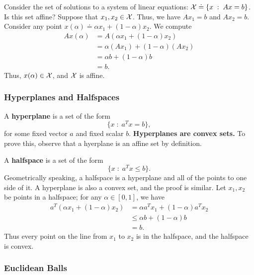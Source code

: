 \documentclass[12pt]{article}
\begin{document}
\begin{example}
Consider the set of solutions to a system of linear equations: ${\mathcal X} \doteq \{x \; : \; Ax = b\}$. Is this set affine? Suppose that $x_1, x_2 \in {\mathcal X}$. Thus, we have $Ax_1 = b$ and $Ax_2 = b$. Consider any point $x(\alpha) \doteq \alpha x_1 + (1-\alpha)x_2$. We compute
%
\begin{align*}
Ax(\alpha) &= A(\alpha x_1 + (1-\alpha)x_2) \\
&= \alpha (Ax_1) + (1-\alpha) (Ax_2) \\
&= \alpha b + (1-\alpha) b \\
&= b.
\end{align*}
%
Thus, $x(\alpha) \in {\mathcal X}$, and ${\mathcal X}$ is affine. 
\end{example}

\subsubsection{Hyperplanes and Halfspaces}

A \textbf{hyperplane} is a set of the form 
%
\begin{equation*}
\{x \; : \; a^T x = b\},
\end{equation*}
%
for some fixed vector $a$ and fixed scalar $b$. \textbf{Hyperplanes are convex sets.} To prove this, observe that a hyerplane is an affine set by definition.

A \textbf{halfspace} is a set of the form
%
\begin{equation*}
\{x \; : \; a^T x \leq b\}.
\end{equation*}
%
Geometrically speaking, a halfspace is a hyperplane and all of the points to one side of it. A hyperplane is also a convex set, and the proof is similar. Let $x_1, x_2$ be points in a halfspace; for any $\alpha \in [0,1]$, we have
%
\begin{align*}
a^T (\alpha x_1 + (1-\alpha) x_2) &= \alpha a^T x_1 + (1-\alpha) a^T x_2 \\
&\leq \alpha b + (1-\alpha) b \\
& = b.
\end{align*}
%
Thus every point on the line from $x_1$ to $x_2$ is in the halfspace, and the halfspace is convex.

\subsubsection{Euclidean Balls}
\end{document}
